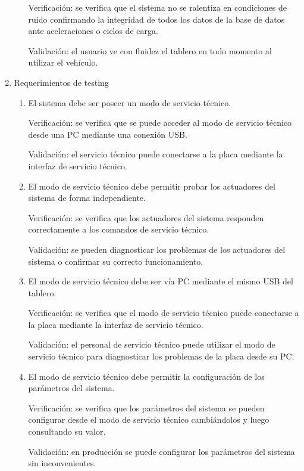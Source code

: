\documentclass[
11pt, %
codirector, %
]{charter}
\begin{document}
\begin{enumerate}
\begin{enumerate}
		            Verificación: se verifica que el sistema no se ralentiza en condiciones de ruido confirmando la integridad de todos los datos de la base de datos ante aceleraciones o ciclos de carga.

		            Validación: el usuario ve con fluidez el tablero en todo momento al utilizar el vehículo.
	      \end{enumerate}
	\item Requerimientos de testing
	      \begin{enumerate}
		      \item El sistema debe ser poseer un modo de servicio técnico.

		            Verificación: se verifica que se puede acceder al modo de servicio técnico desde una PC mediante una conexión USB.

		            Validación: el servicio técnico puede conectarse a la placa mediante la interfaz de servicio técnico.

		      \item El modo de servicio técnico debe permitir probar los actuadores del sistema de forma independiente.

		            Verificación: se verifica que los actuadores del sistema responden correctamente a los comandos de servicio técnico.

		            Validación: se pueden diagnosticar los problemas de los actuadores del sistema o confirmar su correcto funcionamiento.
		      \item El modo de servicio técnico debe ser vía PC mediante el mismo USB del tablero.

		            Verificación: se verifica que el modo de servicio técnico puede conectarse a la placa mediante la interfaz de servicio técnico.

		            Validación: el personal de servicio técnico puede utilizar el modo de servicio técnico para diagnosticar los problemas de la placa desde su PC.
		      \item El modo de servicio técnico debe permitir la configuración de los parámetros del sistema.

		            Verificación: se verifica que los parámetros del sistema se pueden configurar desde el modo de servicio técnico cambiándolos y luego consultando su valor.

		            Validación: en producción se puede configurar los parámetros del sistema sin inconvenientes.


	      \end{enumerate}
\end{enumerate}
\end{document}
